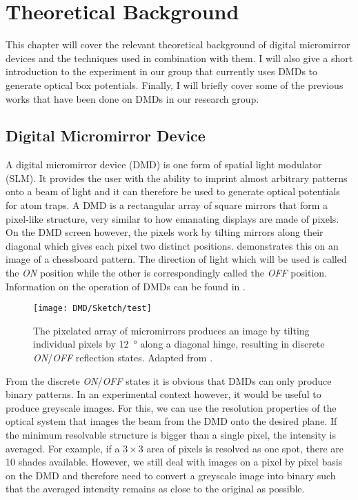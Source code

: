 

\chapter{Theoretical Background}
This chapter will cover the relevant theoretical background of digital micromirror devices and the techniques used in combination with them. I will also give a short introduction to the experiment in our group that currently uses DMDs to generate optical box potentials. Finally, I will briefly cover some of the previous works that have been done on DMDs in our research group.

\section{Digital Micromirror Device}
A digital micromirror device (DMD) is one form of spatial light modulator (SLM). It provides the user with the ability to imprint almost arbitrary patterns onto a beam of light and it can therefore be used to generate optical potentials for atom traps. A DMD is a rectangular array of square mirrors that form a pixel-like structure, very similar to how emanating displays are made of pixels. On the DMD screen however, the pixels work by tilting mirrors along their diagonal which gives each pixel two distinct positions.  demonstrates this on an image of a chessboard pattern. The direction of light which will be used is called the \emph{ON} position while the other is correspondingly called the \emph{OFF} position. Information on the operation of DMDs can be found in \cite{texasinstruments:2018}.
%
\begin{figure}[htbp]
    \centering
    \texttt{[image: DMD/Sketch/test]}
    \caption[Close-up image of a chessboard pattern on a DMD]{The pixelated array of micromirrors produces an image by tilting individual pixels by \SI{12}{\degree} along a diagonal hinge, resulting in discrete \emph{ON}/\emph{OFF} reflection states. Adapted from \cite{krstajic}.}
    \label{fig:dmd_example}
\end{figure}


From the discrete \emph{ON}/\emph{OFF} states it is obvious that DMDs can only produce binary patterns. In an experimental context however, it would be useful to produce greyscale images. For this, we can use the resolution properties of the optical system that images the beam from the DMD onto the desired plane. If the minimum resolvable structure is bigger than a single pixel, the intensity is averaged. For example, if a $3\times 3$ area of pixels is resolved as one spot, there are 10 shades available. However, we still deal with images on a pixel by pixel basis on the DMD and therefore need to convert a greyscale image into binary such that the averaged intensity remains as close to the original as possible.

